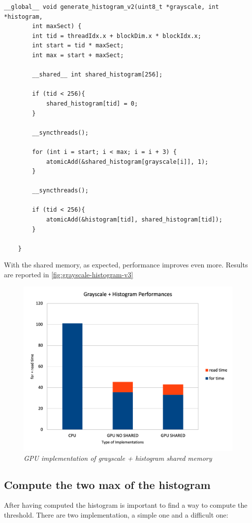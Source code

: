 \documentclass[paper=a4, fontsize=10pt]{scrartcl}	%
\begin{document}
	\begin{lstlisting}[style=CStyle]
	__global__ void generate_histogram_v2(uint8_t *grayscale, int *histogram,
		int maxSect) {
		int tid = threadIdx.x + blockDim.x * blockIdx.x;
		int start = tid * maxSect;
		int max = start + maxSect;
	
		__shared__ int shared_histogram[256];
		
		if (tid < 256){
			shared_histogram[tid] = 0;
		}
	
		__syncthreads();
	
		for (int i = start; i < max; i = i + 3) {
			atomicAdd(&shared_histogram[grayscale[i]], 1);
		}
	
		__syncthreads();
	
		if (tid < 256){
			atomicAdd(&histogram[tid], shared_histogram[tid]);
		}
	
	}
	\end{lstlisting}

	With the shared memory, as expected, performance improves even more. Results are reported in \autoref{fig:grayscale-histogram-v3}

	\begin{figure}[H]
		\centering
		\includegraphics[width=0.65\linewidth]{images/binarization/hist3.png}
		\caption{\textit{GPU implementation of grayscale + histogram shared memory}}
		\label{fig:grayscale-histogram-v3}
	\end{figure}

	\subsection{Compute the two max of the histogram}
				
	After having computed the histogram is important to find a way to compute the threshold. There are two implementation, a simple one and a difficult one:
				
\end{document}
